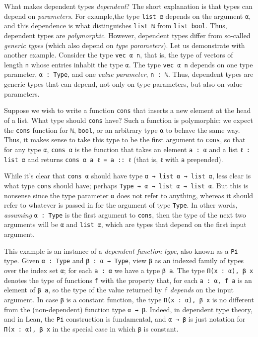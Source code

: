 \documentclass[11pt]{amsart}  %
\begin{document}
What makes dependent types \emph{dependent}? %
The short explanation is that types can depend on \emph{parameters}. For example,the type \lstinline{list α} depends on the argument \lstinline{α}, and this dependence is what distinguishes \lstinline{list ℕ} from \lstinline{list bool}. Thus, dependent types are \emph{polymorphic}.  However, dependent types differ from so-called \emph{generic types} (which also depend on \emph{type parameters}).  Let us demonstrate with another example.  
Consider the type \lstinline{vec α n}, that is, the type of vectors of length 
\lstinline{n} whose entries inhabit the type \lstinline{α}. The type \lstinline{vec α n} depends on one type parameter, \lstinline{α : Type}, and one \emph{value parameter}, \lstinline{n : ℕ}.  Thus, dependent types are generic types that can depend, not only on type parameters, but also on value parameters.

Suppose we wish to write a function \lstinline{cons} that inserts a new element at the head of a list. What type should \lstinline{cons} have? Such a function is polymorphic: we expect the \lstinline{cons} function for \lstinline{ℕ}, \lstinline{bool}, or an arbitrary type \lstinline{α} to behave the same way. Thus, it makes sense to take this type to be the first argument to \lstinline{cons}, so that for any type \lstinline{α}, \lstinline{cons α} is the function that takes an element \lstinline{a : α} and a list 
\lstinline{ℓ : list α} and returns \lstinline{cons α a ℓ = a :: ℓ} 
(that is, \lstinline{ℓ} with \lstinline{a} prepended).

While it's clear that \lstinline{cons α} should have type \lstinline{α → list α → list α}, less clear is what type \lstinline{cons} should have; perhaps \lstinline{Type → α → list α → list α}. But this is nonsense since the type parameter \lstinline{α} does not refer to anything, whereas it should refer to whatever is passed in for the argument of type \lstinline{Type}. In other words, \emph{assuming} \lstinline{α : Type} is the first argument to \lstinline{cons}, then the type of the next two arguments will be \lstinline{α} and \lstinline{list α}, which are types that depend on the first input argument. 

This example is an instance of a \emph{dependent function type}, also known as a \lstinline{Pi} type. Given \lstinline{α : Type} and \lstinline{β : α → Type},
view \lstinline{β} as an indexed family of types over the index set \lstinline{α}; for each \lstinline{a : α} we have a type \lstinline{β a}.  The type \lstinline{Π(x : α), β x} denotes the type of functions \lstinline{f} with the property that, for each \lstinline{a : α, f a} is an element of \lstinline{β a}, so the type of the value returned by \lstinline{f} \emph{depends} on the input argument. In case \lstinline{β} is a constant function, the type \lstinline{Π(x : α), β x} is no different from the (non-dependent) function type \lstinline{α → β}. Indeed, in dependent type theory, and in Lean, the \lstinline{Pi} construction is fundamental, and \lstinline{α → β} is just notation for \lstinline{Π(x : α), β x} in the special case in which \lstinline{β} is constant.
\end{document}
